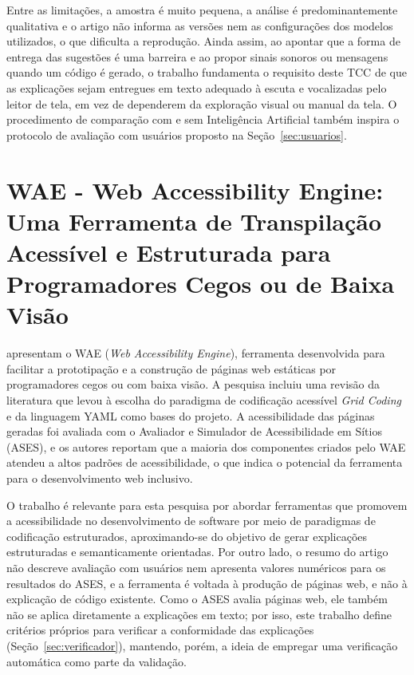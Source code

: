 \documentclass[
    12pt,                   %
    openright,              %
    oneside,                %
    a4paper,                %
    sumario=tradicional,    %
    english,                %
    brazil,                 %
    ]{abntex2}
\begin{document}
Entre as limitações, a amostra é muito pequena, a análise é predominantemente qualitativa e o artigo não informa as versões nem as configurações dos modelos utilizados, o que dificulta a reprodução. Ainda assim, ao apontar que a forma de entrega das sugestões é uma barreira e ao propor sinais sonoros ou mensagens quando um código é gerado, o trabalho fundamenta o requisito deste TCC de que as explicações sejam entregues em texto adequado à escuta e vocalizadas pelo leitor de tela, em vez de dependerem da exploração visual ou manual da tela. O procedimento de comparação com e sem Inteligência Artificial também inspira o protocolo de avaliação com usuários proposto na Seção~\ref{sec:usuarios}.

\section{WAE - Web Accessibility Engine: Uma Ferramenta de Transpilação Acessível e Estruturada para Programadores Cegos ou de Baixa Visão}

\textcite{latinoware40920} apresentam o WAE (\textit{Web Accessibility Engine}), ferramenta desenvolvida para facilitar a prototipação e a construção de páginas web estáticas por programadores cegos ou com baixa visão. A pesquisa incluiu uma revisão da literatura que levou à escolha do paradigma de codificação acessível \textit{Grid Coding} e da linguagem YAML como bases do projeto. A acessibilidade das páginas geradas foi avaliada com o Avaliador e Simulador de Acessibilidade em Sítios (ASES), e os autores reportam que a maioria dos componentes criados pelo WAE atendeu a altos padrões de acessibilidade, o que indica o potencial da ferramenta para o desenvolvimento web inclusivo.

O trabalho é relevante para esta pesquisa por abordar ferramentas que promovem a acessibilidade no desenvolvimento de software por meio de paradigmas de codificação estruturados, aproximando-se do objetivo de gerar explicações estruturadas e semanticamente orientadas. Por outro lado, o resumo do artigo não descreve avaliação com usuários nem apresenta valores numéricos para os resultados do ASES, e a ferramenta é voltada à produção de páginas web, e não à explicação de código existente. Como o ASES avalia páginas web, ele também não se aplica diretamente a explicações em texto; por isso, este trabalho define critérios próprios para verificar a conformidade das explicações (Seção~\ref{sec:verificador}), mantendo, porém, a ideia de empregar uma verificação automática como parte da validação.
\end{document}
